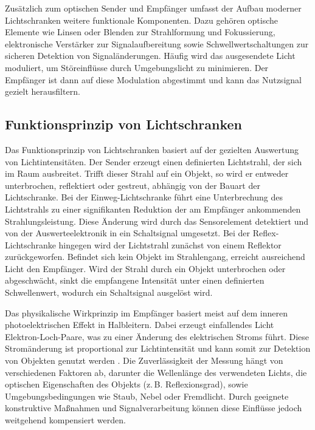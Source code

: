Zusätzlich zum optischen Sender und Empfänger umfasst der Aufbau moderner Lichtschranken weitere funktionale Komponenten. Dazu gehören optische Elemente wie Linsen oder Blenden zur Strahlformung und Fokussierung, elektronische Verstärker zur Signalaufbereitung sowie Schwellwertschaltungen zur sicheren Detektion von Signaländerungen. Häufig wird das ausgesendete Licht moduliert, um Störeinflüsse durch Umgebungslicht zu minimieren. Der Empfänger ist dann auf diese Modulation abgestimmt und kann das Nutzsignal gezielt herausfiltern. \cite{Loeffler-Mang:2012}

\subsection{Funktionsprinzip von Lichtschranken}
Das Funktionsprinzip von Lichtschranken basiert auf der gezielten Auswertung von Lichtintensitäten. 
Der Sender erzeugt einen definierten Lichtstrahl, der sich im Raum ausbreitet. Trifft dieser Strahl auf ein Objekt, so wird er entweder unterbrochen, reflektiert oder gestreut, abhängig von der Bauart der Lichtschranke.
Bei der Einweg-Lichtschranke führt eine Unterbrechung des Lichtstrahls zu einer signifikanten Reduktion der am Empfänger ankommenden Strahlungsleistung. Diese Änderung wird durch das Sensorelement detektiert und von der Auswerteelektronik in ein Schaltsignal umgesetzt. 
Bei der Reflex-Lichtschranke hingegen wird der Lichtstrahl zunächst von einem Reflektor zurückgeworfen. Befindet sich kein Objekt im Strahlengang, erreicht ausreichend Licht den Empfänger. Wird der Strahl durch ein Objekt unterbrochen oder abgeschwächt, sinkt die empfangene Intensität unter einen definierten Schwellenwert, wodurch ein Schaltsignal ausgelöst wird.

Das physikalische Wirkprinzip im Empfänger basiert meist auf dem inneren photoelektrischen Effekt in Halbleitern. Dabei erzeugt einfallendes Licht Elektron-Loch-Paare, was zu einer Änderung des elektrischen Stroms führt. Diese Stromänderung ist proportional zur Lichtintensität und kann somit zur Detektion von Objekten genutzt werden \cite{Feynman:2020}.
Die Zuverlässigkeit der Messung hängt von verschiedenen Faktoren ab, darunter die Wellenlänge des verwendeten Lichts, die optischen Eigenschaften des Objekts (z.\,B. Reflexionsgrad), sowie Umgebungsbedingungen wie Staub, Nebel oder Fremdlicht. Durch geeignete konstruktive Maßnahmen und Signalverarbeitung können diese Einflüsse jedoch weitgehend kompensiert werden.


